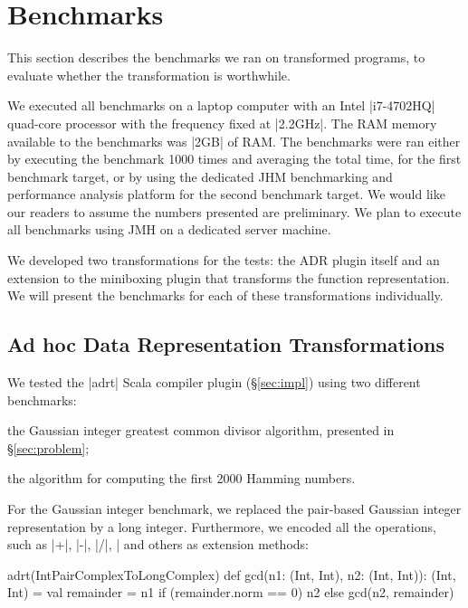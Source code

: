 \section{Benchmarks}
\label{sec:benchmarks}

This section describes the benchmarks we ran on transformed programs, to evaluate whether the transformation is worthwhile.

We executed all benchmarks on a laptop computer with an Intel |i7-4702HQ| quad-core processor with the frequency fixed at |2.2GHz|. The RAM memory available to the benchmarks was |2GB| of RAM. The benchmarks were ran either by executing the benchmark 1000 times and averaging the total time, for the first benchmark target, or by using the dedicated JHM benchmarking and performance analysis platform \cite{aleksey_shipilev_openjdk:_????} for the second benchmark target. We would like our readers to assume the numbers presented are preliminary. We plan to execute all benchmarks using JMH on a dedicated server machine.

We developed two transformations for the tests: the ADR plugin itself and an extension to the miniboxing plugin \cite{miniboxing} that transforms the function representation. We will present the benchmarks for each of these transformations individually.

\subsection{Ad hoc Data Representation Transformations}
\label{sec:benchmarks:ad-hoc}

We tested the |adrt| Scala compiler plugin (\S\ref{sec:impl}) using two different benchmarks:

\begin{compactitem}
\item the Gaussian integer greatest common divisor algorithm, presented in \S\ref{sec:problem};
\item the algorithm for computing the first 2000 Hamming numbers.
\end{compactitem}

For the Gaussian integer benchmark, we replaced the pair-based Gaussian integer representation by a long integer. Furthermore, we encoded all the operations, such as |+|, |-|, |/|, |%
and others as extension methods:

\begin{lstlisting-nobreak}
adrt(IntPairComplexToLongComplex) {
  def gcd(n1: (Int, Int), n2: (Int, Int)): (Int, Int) = {
    val remainder = n1 %
    if (remainder.norm == 0) n2 else gcd(n2, remainder)
  }
}
\end{lstlisting-nobreak}

